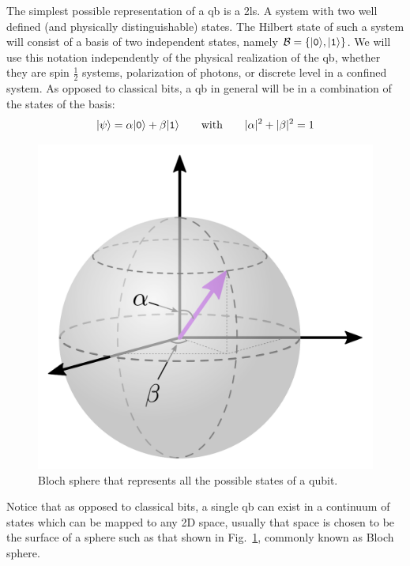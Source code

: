 The simplest possible representation of a \ac{qb} is a \ac{2ls}. A system with two well defined (and physically distinguishable) states. The Hilbert state of such a system will consist of a basis of two independent states, namely $\mathcal{B}=\{|\texttt{0}\rangle,|\texttt{1}\rangle\}$. We will use this notation independently of the physical realization of the \ac{qb}, whether they are spin $\tfrac{1}{2}$ systems, polarization of photons, or discrete level in a confined system.
As opposed to classical bits, a \ac{qb} in general will be in a combination of the states of the basis:
\begin{equation}
  |\psi\rangle = \alpha|\texttt{0}\rangle + \beta|\texttt{1}\rangle \qquad\text{with}\qquad
  |\alpha|^2+|\beta|^2 =1
\label{genstate}
\end{equation}
\begin{figure}[!h]
\centering
\includegraphics{chapter01/figures/bloch_sphere.pdf}
\vspace{-5pt}
\caption{Bloch sphere that represents all the possible states of a qubit.}
\label{Bsph}
\end{figure}
\FloatBarrier
Notice that as opposed to classical bits, a single \ac{qb} can exist in a continuum of states which can be mapped to any 2D space, usually that space is chosen to be the surface of a sphere such as that shown in Fig.~\ref{Bsph}, commonly known as Bloch sphere.

